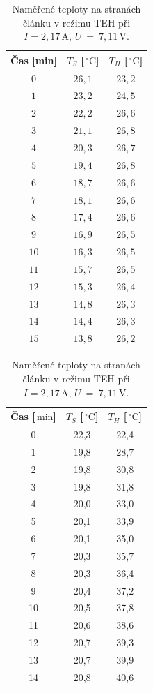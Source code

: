 \documentclass[a4paper,12pt]{article}
\newcommand{\unitC}{\,^\circ\mathrm{C}}
\newcommand{\unitV}{\,\mathrm{V}}
\newcommand{\unitA}{\,\mathrm{A}}
\newcommand{\unitmin}{\,\mathrm{min}}
\begin{document}
\begin{table}[H]
\centering
\renewcommand{\arraystretch}{1.5}

\begin{minipage}{0.47\textwidth}
\centering
\renewcommand{\arraystretch}{1.5}
\begin{tabular}{|c|c|c|}
\hline
Čas \textbf{[min]} & \textbf{$T_S$ [$\unitC$]} & \textbf{$T_H$ [$\unitC$]} \\
\hline
$0$ & $26,1$ & $23,2$  \\
$1$ & $23,2$ & $24,5$  \\
$2$ & $22,2$ & $26,6$  \\
$3$ & $21,1$ & $26,8$  \\
$4$ & $20,3$ & $26,7$  \\
$5$ & $19,4$ & $26,8$  \\
$6$ & $18,7$ & $26,6$  \\
$7$ & $18,1$ & $26,6$  \\
$8$ & $17,4$ & $26,6$  \\
$9$ & $16,9$ & $26,5$  \\
$10$ & $16,3$ & $26,5$  \\
$11$ & $15,7$ & $26,5$  \\
$12$ & $15,3$ & $26,4$  \\
$13$ & $14,8$ & $26,3$  \\
$14$ & $14,4$ & $26,3$  \\
$15$ & $13,8$ & $26,2$  \\
\hline
\end{tabular}
\caption{Naměřené teploty na stranách článku v režimu TEC při $I = 2,18\unitA$, $U~=~6,3\unitV$}
\label{tab:cooling_values}
\end{minipage}
\hfill
\begin{minipage}{0.47\textwidth}
\centering
\renewcommand{\arraystretch}{1.5}
\begin{tabular}{|c|c|c|}
\hline
\textbf{Čas [$\unitmin$]} & \textbf{$T_S$ [$\unitC$]} & \textbf{$T_H$ [$\unitC$]} \\
\hline
0  & 22,3 & 22,4 \\
1  & 19,8 & 28,7 \\
2  & 19,8 & 30,8 \\
3  & 19,8 & 31,8 \\
4  & 20,0 & 33,0 \\
5  & 20,1 & 33,9 \\
6  & 20,1 & 35,0 \\
7  & 20,3 & 35,7 \\
8  & 20,3 & 36,4 \\
9  & 20,4 & 37,2 \\
10 & 20,5 & 37,8 \\
11 & 20,6 & 38,6 \\
12 & 20,7 & 39,3 \\
13 & 20,7 & 39,9 \\
14 & 20,8 & 40,6 \\
\hline
\end{tabular}
\caption{Naměřené teploty na stranách článku v režimu TEH při $I = 2{,}17\unitA$, $U~=~7{,}11\unitV$.}
\label{tab:heating_values}
\end{minipage}
\end{table}
\end{document}
